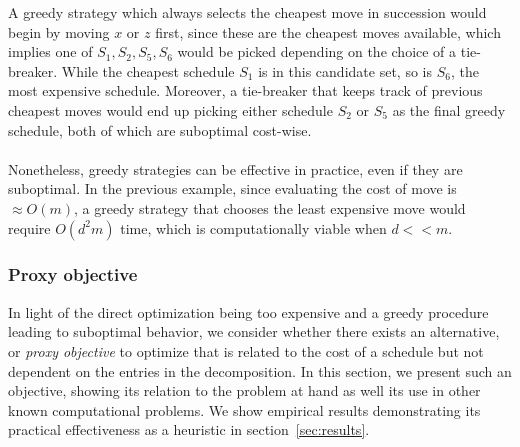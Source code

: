 \documentclass{siamart190516}
\begin{document}
A greedy strategy which always selects the cheapest move in succession would begin by moving $x$ or $z$ first, since these are the cheapest moves available, which implies one of $S_1, S_2, S_5, S_6$ would be picked depending on the choice of a tie-breaker. While the cheapest schedule $S_1$ is in this candidate set, so is $S_6$, the most expensive schedule. Moreover, a tie-breaker that keeps track of previous cheapest moves would end up picking either schedule $S_2$ or $S_5$ as the final greedy schedule, both of which are suboptimal cost-wise.  
\\
\\
\noindent
Nonetheless, greedy strategies can be effective in practice, even if they are suboptimal. In the previous example, since evaluating the cost of move is $\approx O(m)$, a greedy strategy that chooses the least expensive move would require $O(d^2 m)$ time, which is computationally viable when $d << m$. 

\subsubsection{Proxy objective}\label{sec:proxy_objective}
In light of the direct optimization being too expensive and a greedy procedure leading to suboptimal behavior, we consider whether there exists an alternative, or \emph{proxy objective} to optimize that is related to the cost of a schedule but not dependent on the entries in the decomposition. In this section, we present such an objective, showing its relation to the problem at hand as well its use in other known computational problems. 
We show empirical results demonstrating its practical effectiveness as a heuristic in section~\ref{sec:results}.
\end{document}

